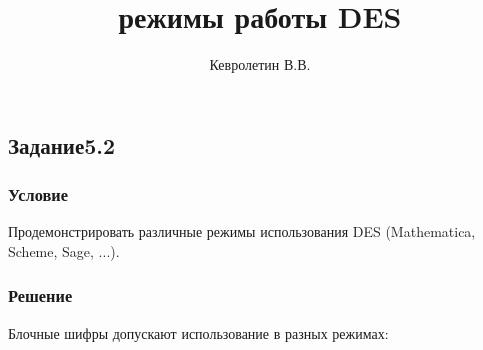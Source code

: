 \documentclass[10pt,a4paper]{article}
\author{Кевролетин В.В.}
\title{режимы работы DES}
\begin{document}
\maketitle

\subsection*{Задание5.2}
\subsubsection*{Условие}
Продемонстрировать различные режимы использования DES (Mathematica,
Scheme, Sage, ...).
\subsubsection*{Решение}
Блочные шифры допускают использование в разных режимах:
\end{document}

